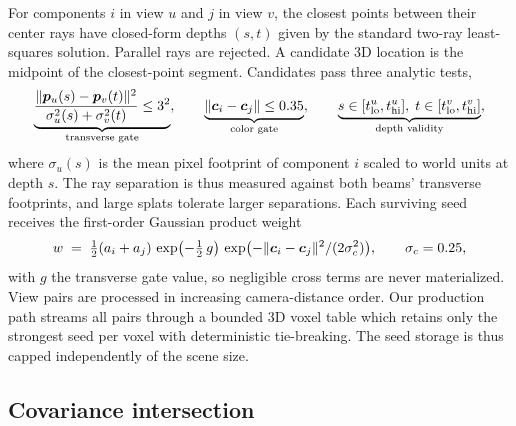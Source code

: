 For components $i$ in view $u$ and $j$ in view $v$, the closest points between their
center rays have closed-form depths $(s, t)$ given by the standard two-ray least-squares
solution.  Parallel rays are rejected.  A candidate 3D location is the midpoint of the
closest-point segment.  Candidates pass three analytic tests,
\begin{equation}
  \underbrace{\frac{\lVert\bm{p}_u(s) - \bm{p}_v(t)\rVert^2}
       {\sigma_u^2(s) + \sigma_v^2(t)} \le 3^2}_{\text{transverse gate}},
  \qquad
  \underbrace{\lVert\bm{c}_i - \bm{c}_j\rVert \le 0.35}_{\text{color gate}},
  \qquad
  \underbrace{s \in [t^u_{\mathrm{lo}}, t^u_{\mathrm{hi}}],\;
              t \in [t^v_{\mathrm{lo}}, t^v_{\mathrm{hi}}]}_{\text{depth validity}},
  \label{eq:gates}
\end{equation}
where $\sigma_u(s)$ is the mean pixel footprint of component $i$ scaled to world units at
depth $s$.  The ray separation is thus measured against both beams' transverse
footprints, and large splats tolerate larger separations.  Each surviving seed receives
the first-order Gaussian product weight
\begin{equation}
  w \;=\; \tfrac12 (a_i + a_j)\,
          \exp\!\big({-\tfrac12\, g}\big)\,
          \exp\!\big({-\lVert\bm{c}_i - \bm{c}_j\rVert^2 / (2\sigma_c^2)}\big),
  \qquad \sigma_c = 0.25,
  \label{eq:seed-weight}
\end{equation}
with $g$ the transverse gate value, so negligible cross terms are never materialized.
View pairs are processed in increasing camera-distance order.  Our production path
streams all pairs through a bounded 3D voxel table which retains only the strongest seed
per voxel with deterministic tie-breaking.  The seed storage is thus capped independently
of the scene size.

\subsection{Covariance intersection}
\label{sec:ci-fusion}

